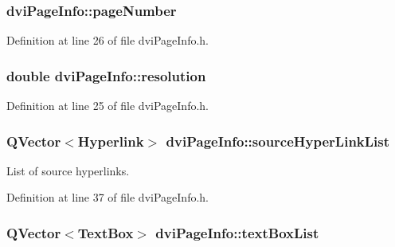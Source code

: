 \hypertarget{classdviPageInfo_a53def64ce72621ae5c95524cec77ee2e}{
\subsubsection[{page\+Number}]{ dvi\+Page\+Info\+::page\+Number}}\label{classdviPageInfo_a53def64ce72621ae5c95524cec77ee2e}


Definition at line 26 of file dvi\+Page\+Info.\+h.

\hypertarget{classdviPageInfo_a1a941bfcf6edfb69562bccf5f392a268}{
\subsubsection[{resolution}]{\setlength{\rightskip}{0pt plus 5cm}double dvi\+Page\+Info\+::resolution}}\label{classdviPageInfo_a1a941bfcf6edfb69562bccf5f392a268}


Definition at line 25 of file dvi\+Page\+Info.\+h.

\hypertarget{classdviPageInfo_ae3d8b5ce976b2df5c29244577362bb4f}{
\subsubsection[{source\+Hyper\+Link\+List}]{\setlength{\rightskip}{0pt plus 5cm}Q\+Vector$<${\bf Hyperlink}$>$ dvi\+Page\+Info\+::source\+Hyper\+Link\+List}}\label{classdviPageInfo_ae3d8b5ce976b2df5c29244577362bb4f}


List of source hyperlinks. 



Definition at line 37 of file dvi\+Page\+Info.\+h.

\hypertarget{classdviPageInfo_a4ba07c38e31cd25fc4987e79cd0968e2}{
\subsubsection[{text\+Box\+List}]{\setlength{\rightskip}{0pt plus 5cm}Q\+Vector$<${\bf Text\+Box}$>$ dvi\+Page\+Info\+::text\+Box\+List}}\label{classdviPageInfo_a4ba07c38e31cd25fc4987e79cd0968e2}


